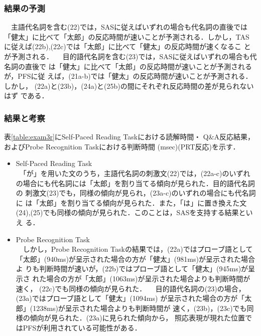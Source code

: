 \subsubsection{結果の予測}
　主語代名詞を含む(22)では，SASに従えばいずれの場合も代名詞の直後では
「健太」に比べて「太郎」の反応時間が速いことが予測される．しかし，TAS
に従えば(22b),(22c)では「太郎」に比べて「健太」の反応時間が速くなるこ
とが予測される．
　目的語代名詞を含む(23)では，SASに従えばいずれの場合も代名詞の直後で
は「健太」に比べて「太郎」の反応時間が速いことが予測されるが，PFSに従
えば，(21a-b)では「健太」の反応時間が速いことが予測される．しかし，
(22a)と(23b)，(24a)と(25b)の間にそれぞれ反応時間の差が見られないはず
である．

\subsubsection{結果と考察}
  表\ref{table:exam3r}にSelf-Paced Reading Taskにおける読解時間・
  Q\&A反応結果，およびProbe Recognition Taskにおける判断時間
  (msec)(PRT反応)を示す．
\vspace{0.5cm}
\begin{itemize}
  \item Self-Paced Reading Task\\
　「が」を用いた文のうち，主語代名詞の刺激文(22)では，(22a-c)のいずれ
の場合にも代名詞には「太郎」を割り当てる傾向が見られた．目的語代名詞の
刺激文(23)でも，同様の傾向が見られ，(23a-c)のいずれの場合にも代名詞に
は「太郎」を割り当てる傾向が見られた．また，「は」に置き換えた文
(24),(25)でも同様の傾向が見られた．このことは，SASを支持する結果といえ
る．
  \item Probe Recognition Task\\
　しかし，Probe Recognition Taskの結果では，(22a)ではプローブ語として
「太郎」(940ms)が呈示された場合の方が「健太」(981ms)が呈示された場合よ
りも判断時間が速いが，(22b)ではプローブ語として「健太」(945ms)が呈示さ
れた場合の方が「太郎」(1063ms)が呈示された場合よりも判断時間が速く，
(22c)でも同様の傾向が見られた．
　目的語代名詞の(23)の場合，(23a)ではプローブ語として「健太」(1094ms)
が呈示された場合の方が「太郎」(1238ms)が呈示された場合よりも判断時間が
速く，(23b)，(23c)でも同様の傾向が見られた．(23a)に見られた傾向から，
照応表現が現れた位置ではPFSが利用されている可能性がある．
\end{itemize}

